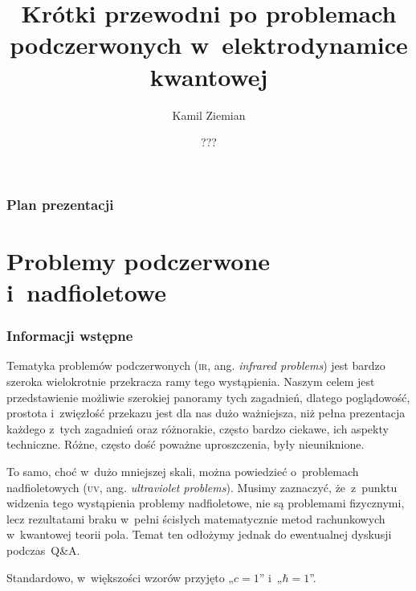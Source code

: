 \documentclass[10pt,t]{beamer}
\title{Krótki przewodni po problemach podczerwonych
  w~elektrodynamice kwantowej}
\author{Kamil Ziemian \\
  \email}
\date[???]{???}
\begin{document}





\RaggedRight





\maketitle





\begin{frame}
  \frametitle{Plan prezentacji}


  \tableofcontents

\end{frame}










\section{Problemy podczerwone i~nadfioletowe}



\begin{frame}
  \frametitle{Informacji wstępne}


  Tematyka problemów podczerwonych (\textsc{ir}, ang. \textit{infrared
    problems}) jest bardzo szeroka wielokrotnie przekracza ramy tego
  wystąpienia. Naszym celem jest przedstawienie możliwie szerokiej panoramy
  tych zagadnień, dlatego poglądowość, prostota i~zwięzłość przekazu jest
  dla nas dużo ważniejsza, niż pełna prezentacja każdego z~tych zagadnień
  oraz różnorakie, często bardzo ciekawe, ich aspekty techniczne. Różne,
  często dość poważne uproszczenia, były nieuniknione.

  To samo, choć w~dużo mniejszej skali, można powiedzieć o~problemach
  nadfioletowych (\textsc{uv}, ang. \textit{ultraviolet problems}).
  Musimy zaznaczyć, że~z~punktu widzenia tego wystąpienia problemy
  nadfioletowe, \alert{nie} są problemami fizycznymi, lecz rezultatami
  braku w~pełni ścisłych matematycznie metod rachunkowych w~kwantowej
  teorii pola. Temat ten odłożymy jednak do ewentualnej dyskusji
  podczas~Q\&A.

  Standardowo, w~większości wzorów przyjęto „$c = 1$” i~„$\hbar = 1$”.

\end{frame}
\end{document}
